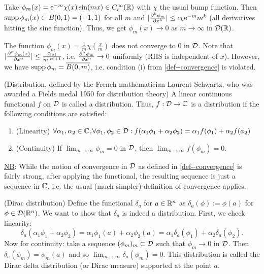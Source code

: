 \documentclass[11pt]{article}
\begin{document}
			\begin{eg}
				Take $\phi_m(x)=\e{-m}\chi(x)\sin(mx)\in C^\infty_c(\R)$ with $\chi$ the usual bump function. Then $\supp\phi_m(x)\subset B(0,1)=(-1,1)$ for all $m$ and $|\del[k]{\phi_m}{x^k}|\le c_k\e{-m}m^k$ (all derivatives hitting the sine function). Thus, we get $\phi_m(x)\to0$ as $m\to\infty$ in $\D(\R)$.	
			\end{eg}

			\begin{eg}
				The function $\phi_m(x)=\frac{1}{m}\chi(\frac{x}{m})$ does not converge to 0 in $\D$. Note that $|\del[\alpha]{\phi_m(x)}{x^\alpha}|\le\frac{c_{|\alpha|}}{m^{|\alpha|+1}}$, i.e. $\del[\alpha]{\phi_m}{x^\alpha}\to0$ uniformly (RHS is independent of $x$). However, we have $\supp\phi_m=\overline{B(0,m)}$, i.e. condition (i) from \autoref{def--convergence} is violated.
			\end{eg}

			\begin{defi}
				(Distribution, defined by the French mathematician Laurent Schwartz, who was awarded a Fields medal 1950 for distribution theory) A linear continuous functional $f$ on $\D$ is called a distribution. Thus, $f:\D\rightarrow\CC$ is a distribution if the following conditions are satisfied:
				\begin{enumerate}
					\item (Linearity) $\forall\alpha_1,\alpha_2\in\CC, \forall\phi_1,\phi_2\in\D:f(\alpha_1\phi_1+\alpha_2\phi_2)=\alpha_1f(\phi_1)+\alpha_2f(\phi_2)$
					\item (Continuity) If $\lim_{m\to\infty}\phi_m=0$ in $\D$, then $\lim_{m\to\infty}f(\phi_m)=0$.
				\end{enumerate}
			\end{defi}

			\noindent\underline{NB}: While the notion of convergence in $\D$ as defined in \autoref{def--convergence} is fairly strong, after applying the functional, the resulting sequence is just a sequence in $\CC$, i.e. the usual (much simpler) definition of convergence applies.
			
			\begin{eg}(Dirac distribution)
				Define the functional $\delta_a$ for $a\in\R^n$ as $\delta_a(\phi):=\phi(a)$ for $\phi\in\D(\R^n)$. We want to show that $\delta_a$ is indeed a distribution. First, we check linearity:
				\begin{equation*}
					\delta_a(\alpha_1\phi_1+ \alpha_2\phi_2)=\alpha_1\phi_1(a)+\alpha_2\phi_2(a)=\alpha_1\delta_a(\phi_1)+ \alpha_2\delta_a(\phi_2).
				\end{equation*}
				Now for continuity: take a sequence $(\phi_m)_m\subset\D$ such that $\phi_m\to0$ in $\D$. Then $\delta_a(\phi_m)=\phi_m(a)$ and so $\lim_{m\to\infty}\delta_a(\phi_m)=0$. This distribution is called the Dirac delta distribution (or Dirac measure) supported at the point $a$.
			\end{eg}
\end{document}
